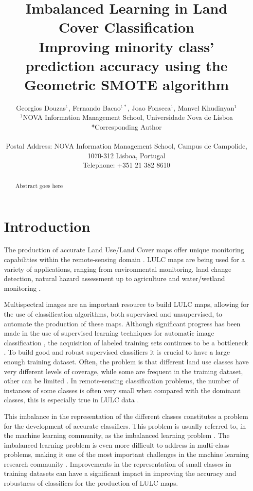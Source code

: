 \documentclass[parskip=full]{scrartcl}
\title{Imbalanced Learning in Land Cover Classification  \\ \LARGE{Improving minority class' prediction accuracy using the Geometric SMOTE algorithm}}
\author{
	Georgios Douzas\(^{1}\), Fernando Bacao\(^{1*}\), Joao Fonseca\(^{1}\), Manvel Khudinyan\(^{1}\)
	\\
	\small{\(^{1}\)NOVA Information Management School, Universidade Nova de Lisboa}
	\\
	\small{*Corresponding Author}
	\\
	\\
	\small{Postal Address: NOVA Information Management School, Campus de Campolide, 1070-312 Lisboa, Portugal}
	\\
	\small{Telephone: +351 21 382 8610}
}
\date{}
\begin{document}
\maketitle

\begin{abstract}
Abstract goes here
\end{abstract}

\section{Introduction}

The production of accurate Land Use/Land Cover maps offer unique monitoring
capabilities within the remote-sensing domain \cite{Mellor2015}. LULC maps are
being used for a variety of applications, ranging from environmental
monitoring, land change detection, natural hazard assessment up to agriculture
and water/wetland monitoring \cite{Khatami2016}.

Multispectral images are an important resource to build LULC maps, allowing for
the use of classification algorithms, both supervised and unsupervised, to
automate the production of these maps. Although significant progress has been
made in the use of supervised learning techniques for automatic image
classification \cite{Tewkesbury2015}, the acquisition of labeled training sets
continues to be a bottleneck \cite{Rajan2008}. To build  good and robust
supervised classifiers it is crucial to have a large enough training dataset.
Often, the problem is that different land use classes have very different
levels of coverage, while some are frequent in the training dataset, other can
be limited \cite{Feng2019}. In remote-sensing classification problems, the
number of instances of some classes is often very small when compared with the
dominant classes, this is especially true in LULC data \cite{Williams2009,
Cenggoro2018}.

This imbalance in the representation of the different classes constitutes a
problem for the development of accurate classifiers. This problem is usually
referred to, in the machine learning community, as the imbalanced learning
problem \cite{Chawla2004}. The imbalanced learning problem is even more
difficult to address in multi-class problems, making it one of the most
important challenges in the machine learning research community
\cite{Garcia2018}. Improvements in the representation of small classes in
training datasets can have a significant impact in improving the accuracy and
robustness of classifiers for the production of LULC maps.
\end{document}
